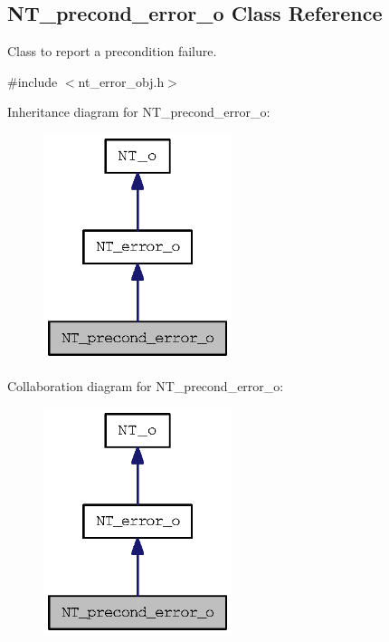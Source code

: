 \subsection{NT\_\-precond\_\-error\_\-o Class Reference}
\label{class_n_t__precond__error__o}


Class to report a precondition failure.  




{\ttfamily \#include $<$nt\_\-error\_\-obj.h$>$}



Inheritance diagram for NT\_\-precond\_\-error\_\-o:
\nopagebreak
\begin{figure}[H]
\begin{center}
\leavevmode
\includegraphics[width=156pt]{class_n_t__precond__error__o__inherit__graph}
\end{center}
\end{figure}


Collaboration diagram for NT\_\-precond\_\-error\_\-o:
\nopagebreak
\begin{figure}[H]
\begin{center}
\leavevmode
\includegraphics[width=156pt]{class_n_t__precond__error__o__coll__graph}
\end{center}
\end{figure}
